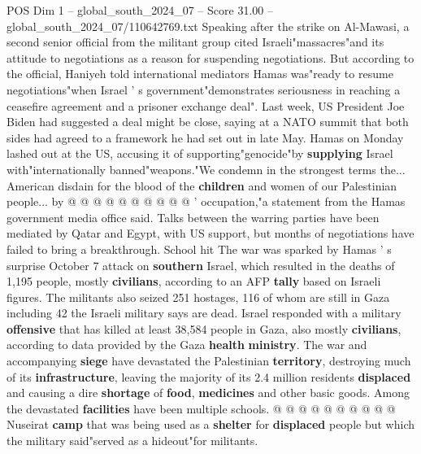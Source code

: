\begin{textsample}{POS Dim 1 – global\_south\_2024\_07 – Score 31.00 – global\_south\_2024\_07/110642769.txt}
Speaking after the strike on Al-Mawasi, a second senior official from the militant group cited Israeli"massacres"and its attitude to negotiations as a reason for suspending negotiations.
But according to the official, Haniyeh told international mediators Hamas was"ready to resume negotiations"when Israel ' s government"demonstrates seriousness in reaching a ceasefire agreement and a prisoner exchange deal".
Last week, US President Joe Biden had suggested a deal might be close, saying at a NATO summit that both sides had agreed to a framework he had set out in late May.
Hamas on Monday lashed out at the US, accusing it of supporting"genocide"by \textbf{supplying} Israel with"internationally banned"weapons."We condemn in the strongest terms the...
American disdain for the blood of the \textbf{children} and women of our Palestinian people... by @ @ @ @ @ @ @ @ @ @ ' occupation,"a statement from the Hamas government media office said.
Talks between the warring parties have been mediated by Qatar and Egypt, with US support, but months of negotiations have failed to bring a breakthrough.
School hit The war was sparked by Hamas ' s surprise October 7 attack on \textbf{southern} Israel, which resulted in the deaths of 1,195 people, mostly \textbf{civilians}, according to an AFP \textbf{tally} based on Israeli figures.
The militants also seized 251 hostages, 116 of whom are still in Gaza including 42 the Israeli military says are dead.
Israel responded with a military \textbf{offensive} that has killed at least 38,584 people in Gaza, also mostly \textbf{civilians}, according to data provided by the Gaza \textbf{health} \textbf{ministry}.
The war and accompanying \textbf{siege} have devastated the Palestinian \textbf{territory}, destroying much of its \textbf{infrastructure}, leaving the majority of its 2.4 million residents \textbf{displaced} and causing a dire \textbf{shortage} of \textbf{food}, \textbf{medicines} and other basic goods.
Among the devastated \textbf{facilities} have been multiple schools. @ @ @ @ @ @ @ @ @ @ Nuseirat \textbf{camp} that was being used as a \textbf{shelter} for \textbf{displaced} people but which the military said"served as a hideout"for militants.

\end{textsample}
